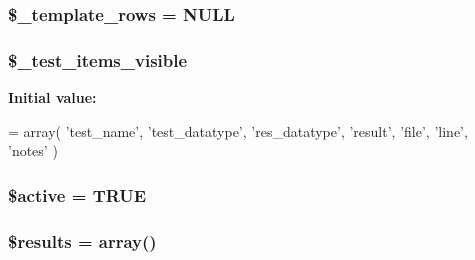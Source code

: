 \subsubsection[{\$\+\_\+template\+\_\+rows}]{\setlength{\rightskip}{0pt plus 5cm}\$\+\_\+template\+\_\+rows = N\+U\+L\+L\hspace{0.3cm}{\ttfamily [protected]}}\label{class_c_i___unit__test_a5d3e2ba4262eb08f117b1e6842f1f162}
\hypertarget{class_c_i___unit__test_aa8b5dd7058c9c945ed964e96777d72c4}{}
\subsubsection[{\$\+\_\+test\+\_\+items\+\_\+visible}]{\setlength{\rightskip}{0pt plus 5cm}\$\+\_\+test\+\_\+items\+\_\+visible\hspace{0.3cm}{\ttfamily [protected]}}\label{class_c_i___unit__test_aa8b5dd7058c9c945ed964e96777d72c4}
{\bfseries Initial value\+:}
\begin{DoxyCode}
= array(
            \textcolor{stringliteral}{'test\_name'},
            \textcolor{stringliteral}{'test\_datatype'},
            \textcolor{stringliteral}{'res\_datatype'},
            \textcolor{stringliteral}{'result'},
            \textcolor{stringliteral}{'file'},
            \textcolor{stringliteral}{'line'},
            \textcolor{stringliteral}{'notes'}
    )
\end{DoxyCode}
\hypertarget{class_c_i___unit__test_aacd1fa47b7ea59451aff98beca4360ae}{}
\subsubsection[{\$active}]{\setlength{\rightskip}{0pt plus 5cm}\${\bf active} = T\+R\+U\+E}\label{class_c_i___unit__test_aacd1fa47b7ea59451aff98beca4360ae}
\hypertarget{class_c_i___unit__test_a233d12bd8b6d3453e9a7a3f0b8c31db2}{}
\subsubsection[{\$results}]{\setlength{\rightskip}{0pt plus 5cm}\$results = array()}\label{class_c_i___unit__test_a233d12bd8b6d3453e9a7a3f0b8c31db2}
\hypertarget{class_c_i___unit__test_a856bf794dded1ba70be4dfae635a1b06}{}
